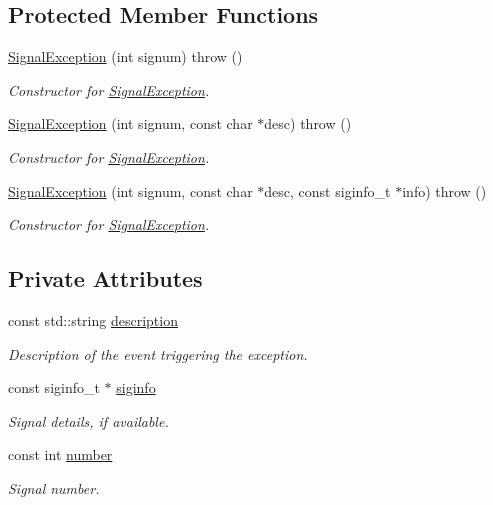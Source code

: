\subsection*{\-Protected \-Member \-Functions}
\begin{DoxyCompactItemize}
\item 
\hyperlink{classLibWheel_1_1SignalException_a6dec8b8da98fa48504123e7224d50a97}{\-Signal\-Exception} (int signum)  throw ()
\begin{DoxyCompactList}\small\item\em \-Constructor for \hyperlink{classLibWheel_1_1SignalException}{\-Signal\-Exception}. \end{DoxyCompactList}\item 
\hyperlink{classLibWheel_1_1SignalException_ae6be47f1a5842eb753c4f3e6b2e08e38}{\-Signal\-Exception} (int signum, const char $\ast$desc)  throw ()
\begin{DoxyCompactList}\small\item\em \-Constructor for \hyperlink{classLibWheel_1_1SignalException}{\-Signal\-Exception}. \end{DoxyCompactList}\item 
\hyperlink{classLibWheel_1_1SignalException_ad0132d99a0decc74c6c59c782340713f}{\-Signal\-Exception} (int signum, const char $\ast$desc, const siginfo\-\_\-t $\ast$info)  throw ()
\begin{DoxyCompactList}\small\item\em \-Constructor for \hyperlink{classLibWheel_1_1SignalException}{\-Signal\-Exception}. \end{DoxyCompactList}\end{DoxyCompactItemize}
\subsection*{\-Private \-Attributes}
\begin{DoxyCompactItemize}
\item 
const std\-::string \hyperlink{classLibWheel_1_1SignalException_a859cd244b034ef6514d695d233463049}{description}
\begin{DoxyCompactList}\small\item\em \-Description of the event triggering the exception. \end{DoxyCompactList}\item 
const siginfo\-\_\-t $\ast$ \hyperlink{classLibWheel_1_1SignalException_a687eb8c7e9e577738968313c1be0cd5b}{siginfo}
\begin{DoxyCompactList}\small\item\em \-Signal details, if available. \end{DoxyCompactList}\item 
const int \hyperlink{classLibWheel_1_1SignalException_a252b673e5b01bd416b2edbe38eeaac28}{number}
\begin{DoxyCompactList}\small\item\em \-Signal number. \end{DoxyCompactList}\end{DoxyCompactItemize}


